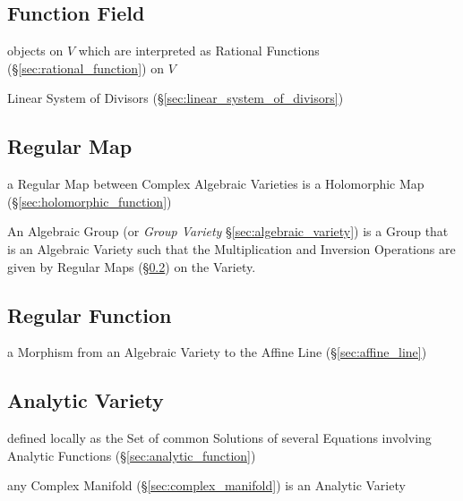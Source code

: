 \subsection{Function Field}\label{sec:function_field}

objects on $V$ which are interpreted as Rational Functions
(\S\ref{sec:rational_function}) on $V$

\fist Linear System of Divisors (\S\ref{sec:linear_system_of_divisors})



\subsection{Regular Map}\label{sec:regular_map}

a Regular Map between Complex Algebraic Varieties is a Holomorphic Map
(\S\ref{sec:holomorphic_function})

An Algebraic Group (or \emph{Group Variety} \S\ref{sec:algebraic_variety}) is a
Group that is an Algebraic Variety such that the Multiplication and Inversion
Operations are given by Regular Maps (\S\ref{sec:regular_map}) on the Variety.



\subsection{Regular Function}\label{sec:regular_function}

a Morphism from an Algebraic Variety to the Affine Line
(\S\ref{sec:affine_line})



\subsection{Analytic Variety}\label{sec:analytic_variety}

defined locally as the Set of common Solutions of several Equations involving
Analytic Functions (\S\ref{sec:analytic_function})

any Complex Manifold (\S\ref{sec:complex_manifold}) is an Analytic Variety



